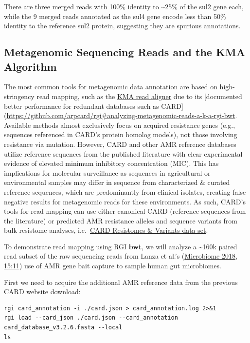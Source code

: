 \documentclass[
]{book}
\begin{document}
There are three merged reads with 100\% identity to \textasciitilde25\% of the sul2 gene each, while the 9 merged reads annotated as the sul4 gene encode less than 50\% identity to the reference sul2 protein, suggesting they are spurious annotations.

\subsection{Metagenomic Sequencing Reads and the KMA Algorithm}\label{metagenomic-sequencing-reads-and-the-kma-algorithm}

The most common tools for metagenomic data annotation are based on high-stringency read mapping, such as the \href{https://bitbucket.org/genomicepidemiology/kma/src/master}{KMA read aligner} due to its {[}documented better performance for redundant databases such as CARD{]}(\url{https://github.com/arpcard/rgi\#analyzing-metagenomic-reads-a-k-a-rgi-bwt}. Available methods almost exclusively focus on acquired resistance genes (e.g., sequences referenced in CARD's protein homolog models), not those involving resistance via mutation. However, CARD and other AMR reference databases utilize reference sequences from the published literature with clear experimental evidence of elevated minimum inhibitory concentration (MIC). This has implications for molecular surveillance as sequences in agricultural or environmental samples may differ in sequence from characterized \& curated reference sequences, which are predominantly from clinical isolates, creating false negative results for metagenomic reads for these environments. As such, CARD's tools for read mapping can use either canonical CARD (reference sequences from the literature) or predicted AMR resistance alleles and sequence variants from bulk resistome analyses, i.e.~\href{https://card.mcmaster.ca/resistomes}{CARD Resistomes \& Variants data set}.

To demonstrate read mapping using RGI \textbf{bwt}, we will analyze a \textasciitilde160k paired read subset of the raw sequencing reads from Lanza et al.'s (\href{https://www.ncbi.nlm.nih.gov/pubmed/29335005}{Microbiome 2018, 15:11}) use of AMR gene bait capture to sample human gut microbiomes.

First we need to acquire the additional AMR reference data from the previous CARD website download:

\begin{verbatim}
rgi card_annotation -i ./card.json > card_annotation.log 2>&1
rgi load --card_json ./card.json --card_annotation card_database_v3.2.6.fasta --local
ls
\end{verbatim}
\end{document}
